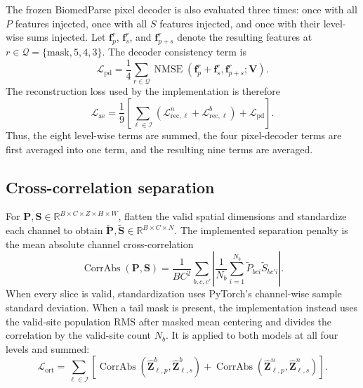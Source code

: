 \documentclass[10pt]{article}
\newcommand{\R}{\mathbb{R}}
\newcommand{\cL}{\mathcal{L}}
\begin{document}
The frozen BiomedParse pixel decoder is also evaluated three times: once with
all $P$ features injected, once with all $S$ features injected, and once with
their level-wise sums injected.  Let
$\bm{f}^{r}_{p}$, $\bm{f}^{r}_{s}$, and $\bm{f}^{r}_{p+s}$ denote the resulting
features at $r\in\mathcal{Q}=\{\text{mask},5,4,3\}$.  The decoder consistency
term is
\begin{equation}
    \cL_{\mathrm{pd}}
    =\frac{1}{4}\sum_{r\in\mathcal{Q}}
      \operatorname{NMSE}
      (\bm{f}^{r}_{p}+\bm{f}^{r}_{s},\bm{f}^{r}_{p+s};\bm{V}).
\end{equation}
The reconstruction loss used by the implementation is therefore
\begin{equation}
    \cL_{\mathrm{ae}}
    =\frac{1}{9}\left[
       \sum_{\ell\in\mathcal{I}}
       \left(\cL^{n}_{\mathrm{rec},\ell}
             +\cL^{b}_{\mathrm{rec},\ell}\right)
       +\cL_{\mathrm{pd}}
     \right].
    \label{eq:ae-total}
\end{equation}
Thus, the eight level-wise terms are summed, the four pixel-decoder terms are
first averaged into one term, and the resulting nine terms are averaged.

\subsection{Cross-correlation separation}

For $\bm{P},\bm{S}\in\R^{B\times C\times Z\times H\times W}$, flatten the
valid spatial dimensions and standardize each channel to obtain
$\widetilde{\bm{P}},\widetilde{\bm{S}}\in\R^{B\times C\times N}$.  The
implemented separation penalty is the mean absolute channel cross-correlation
\begin{equation}
    \operatorname{CorrAbs}(\bm{P},\bm{S})
    =\frac{1}{BC^2}\sum_{b,c,c'}
       \left|
       \frac{1}{N_b}\sum_{i=1}^{N_b}
       \widetilde P_{bci}\widetilde S_{bc'i}
       \right|.
\end{equation}
When every slice is valid, standardization uses PyTorch's channel-wise sample
standard deviation.  When a tail mask is present, the implementation instead
uses the valid-site population RMS after masked mean centering and divides the
correlation by the valid-site count $N_b$.
It is applied to both models at all four levels and summed:
\begin{equation}
    \cL_{\mathrm{ort}}
    =\sum_{\ell\in\mathcal{I}}
      \left[
      \operatorname{CorrAbs}(\widehat{\bm{Z}}^{b}_{\ell,p},
                              \widehat{\bm{Z}}^{b}_{\ell,s})
      +
      \operatorname{CorrAbs}(\widehat{\bm{Z}}^{n}_{\ell,p},
                              \widehat{\bm{Z}}^{n}_{\ell,s})
      \right].
    \label{eq:ortho}
\end{equation}
\end{document}
